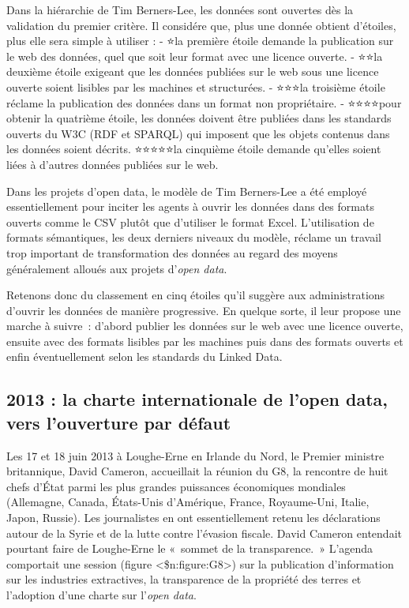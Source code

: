 \documentclass[]{book}
\theoremstyle{definition}
\theoremstyle{definition}
\theoremstyle{definition}
\theoremstyle{remark}
\begin{document}
Dans la hiérarchie de Tim Berners-Lee, les données sont ouvertes dès la
validation du premier critère. Il considére que, plus une donnée obtient
d'étoiles, plus elle sera simple à utiliser : - ⭐la première étoile
demande la publication sur le web des données, quel que soit leur format
avec une licence ouverte. - ⭐⭐la deuxième étoile exigeant que les
données publiées sur le web sous une licence ouverte soient lisibles par
les machines et structurées. - ⭐⭐⭐la troisième étoile réclame la
publication des données dans un format non propriétaire. - ⭐⭐⭐⭐pour
obtenir la quatrième étoile, les données doivent être publiées dans les
standards ouverts du W3C (RDF et SPARQL) qui imposent que les objets
contenus dans les données soient décrits. ⭐⭐⭐⭐⭐la cinquième étoile
demande qu'elles soient liées à d'autres données publiées sur le web.

Dans les projets d'open data, le modèle de Tim Berners-Lee a été employé
essentiellement pour inciter les agents à ouvrir les données dans des
formats ouverts comme le CSV plutôt que d'utiliser le format Excel.
L'utilisation de formats sémantiques, les deux derniers niveaux du
modèle, réclame un travail trop important de transformation des données
au regard des moyens généralement alloués aux projets d'\emph{open
data}.

Retenons donc du classement en cinq étoiles qu'il suggère aux
administrations d'ouvrir les données de manière progressive. En quelque
sorte, il leur propose une marche à suivre~: d'abord publier les données
sur le web avec une licence ouverte, ensuite avec des formats lisibles
par les machines puis dans des formats ouverts et enfin éventuellement
selon les standards du Linked Data.

\subsection{2013 : la charte internationale de l'open data, vers
l'ouverture par
défaut}\label{la-charte-internationale-de-lopen-data-vers-louverture-par-defaut}

Les 17 et 18 juin 2013 à Loughe-Erne en Irlande du Nord, le Premier
ministre britannique, David Cameron, accueillait la réunion du G8, la
rencontre de huit chefs d'État parmi les plus grandes puissances
économiques mondiales (Allemagne, Canada, États-Unis d'Amérique, France,
Royaume-Uni, Italie, Japon, Russie). Les journalistes en ont
essentiellement retenu les déclarations autour de la Syrie et de la
lutte contre l'évasion fiscale. David Cameron entendait pourtant faire
de Loughe-Erne le «~sommet de la transparence.~» L'agenda comportait une
session (figure \textless{}\$n:figure:G8\textgreater{}) sur la
publication d'information sur les industries extractives, la
transparence de la propriété des terres et l'adoption d'une charte sur
l'\emph{open data}.
\end{document}
